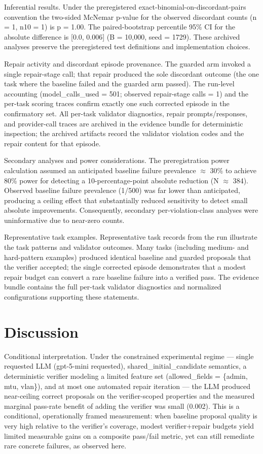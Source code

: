 \documentclass[conference]{IEEEtran}
\begin{document}
Inferential results. Under the preregistered exact-binomial-on-discordant-pairs convention the two-sided McNemar p-value for the observed discordant counts (n = 1, n10 = 1) is p = 1.00. The paired-bootstrap percentile 95\% CI for the absolute difference is [0.0, 0.006] (B = 10,000, seed = 1729). These archived analyses preserve the preregistered test definitions and implementation choices.

Repair activity and discordant episode provenance. The guarded arm invoked a single repair-stage call; that repair produced the sole discordant outcome (the one task where the baseline failed and the guarded arm passed). The run-level accounting (model\_calls\_used = 501; observed repair-stage calls = 1) and the per-task scoring traces confirm exactly one such corrected episode in the confirmatory set. All per-task validator diagnostics, repair prompts/responses, and provider-call traces are archived in the evidence bundle for deterministic inspection; the archived artifacts record the validator violation codes and the repair content for that episode.

Secondary analyses and power considerations. The preregistration power calculation assumed an anticipated baseline failure prevalence \ensuremath{\approx} 30\% to achieve 80\% power for detecting a 10-percentage-point absolute reduction (N \ensuremath{\approx} 384). Observed baseline failure prevalence (1/500) was far lower than anticipated, producing a ceiling effect that substantially reduced sensitivity to detect small absolute improvements. Consequently, secondary per-violation-class analyses were uninformative due to near-zero counts.

Representative task examples. Representative task records from the run illustrate the task patterns and validator outcomes. Many tasks (including medium- and hard-pattern examples) produced identical baseline and guarded proposals that the verifier accepted; the single corrected episode demonstrates that a modest repair budget can convert a rare baseline failure into a verified pass. The evidence bundle contains the full per-task validator diagnostics and normalized configurations supporting these statements.

\section{Discussion}
Conditional interpretation. Under the constrained experimental regime --- single requested LLM (gpt-5-mini requested), shared\_initial\_candidate semantics, a deterministic verifier modeling a limited feature set (allowed\_fields = \{admin, mtu, vlan\}), and at most one automated repair iteration --- the LLM produced near-ceiling correct proposals on the verifier-scoped properties and the measured marginal pass-rate benefit of adding the verifier was small (0.002). This is a conditional, operationally framed measurement: when baseline proposal quality is very high relative to the verifier's coverage, modest verifier+repair budgets yield limited measurable gains on a composite pass/fail metric, yet can still remediate rare concrete failures, as observed here.
\end{document}

